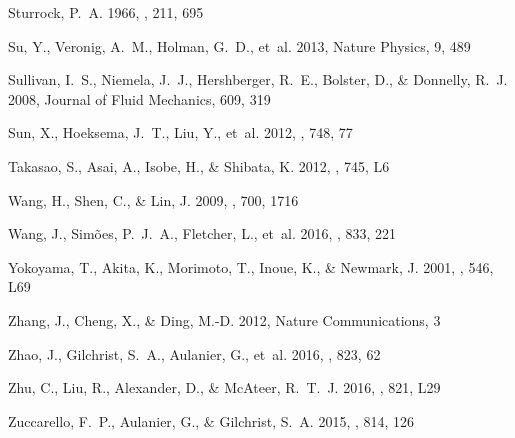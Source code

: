 \documentclass[apj]{emulateapj}
\begin{document}
\begin{thebibliography}{66}
{Sturrock}, P.~A. 1966, \nat, 211, 695

{Su}, Y., {Veronig}, A.~M., {Holman}, G.~D., {et~al.} 2013, Nature Physics, 9,
  489

Sullivan, I.~S., Niemela, J.~J., Hershberger, R.~E., Bolster, D., \& Donnelly,
  R.~J. 2008, Journal of Fluid Mechanics, 609, 319

{Sun}, X., {Hoeksema}, J.~T., {Liu}, Y., {et~al.} 2012, \apj, 748, 77

{Takasao}, S., {Asai}, A., {Isobe}, H., \& {Shibata}, K. 2012, \apjl, 745, L6

{Wang}, H., {Shen}, C., \& {Lin}, J. 2009, \apj, 700, 1716

{Wang}, J., {Sim{\~o}es}, P.~J.~A., {Fletcher}, L., {et~al.} 2016, \apj, 833,
  221

{Yokoyama}, T., {Akita}, K., {Morimoto}, T., {Inoue}, K., \& {Newmark}, J.
  2001, \apjl, 546, L69

{Zhang}, J., {Cheng}, X., \& {Ding}, M.-D. 2012, Nature Communications, 3

{Zhao}, J., {Gilchrist}, S.~A., {Aulanier}, G., {et~al.} 2016, \apj, 823, 62

{Zhu}, C., {Liu}, R., {Alexander}, D., \& {McAteer}, R.~T.~J. 2016, \apjl, 821,
  L29

{Zuccarello}, F.~P., {Aulanier}, G., \& {Gilchrist}, S.~A. 2015, \apj, 814, 126

\end{thebibliography}
\end{document}

